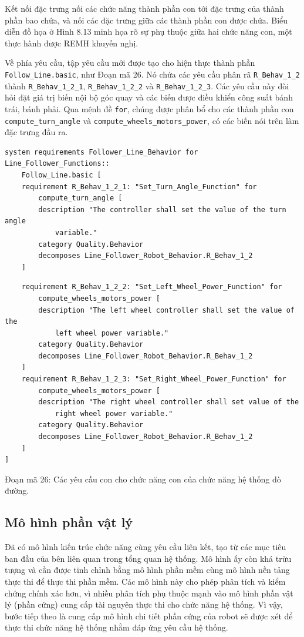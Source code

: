 Kết nối đặc trưng nối các chức năng thành phần con tới đặc trưng của thành phần bao chứa, và nối các đặc trưng giữa các thành phần con được chứa. Biểu diễn đồ họa ở Hình 8.13 minh họa rõ sự phụ thuộc giữa hai chức năng con, một thực hành được REMH khuyến nghị.

Về phía yêu cầu, tập yêu cầu mới được tạo cho hiện thực thành phần \texttt{Follow\_Line.basic}, như Đoạn mã 26. Nó chứa các yêu cầu phân rã \texttt{R\_Behav\_1\_2} thành \texttt{R\_Behav\_1\_2\_1}, \texttt{R\_Behav\_1\_2\_2} và \texttt{R\_Behav\_1\_2\_3}. Các yêu cầu này đòi hỏi đặt giá trị biến nội bộ góc quay và các biến được điều khiển công suất bánh trái, bánh phải. Qua mệnh đề \texttt{for}, chúng được phân bổ cho các thành phần con \texttt{compute\_turn\_angle} và \texttt{compute\_wheels\_motors\_power}, có các biến nói trên làm đặc trưng đầu ra.
\begin{verbatim}
system requirements Follower_Line_Behavior for Line_Follower_Functions::
    Follow_Line.basic [
    requirement R_Behav_1_2_1: "Set_Turn_Angle_Function" for
        compute_turn_angle [
        description "The controller shall set the value of the turn angle
            variable."
        category Quality.Behavior
        decomposes Line_Follower_Robot_Behavior.R_Behav_1_2
    ]
\end{verbatim}
\begin{verbatim}
    requirement R_Behav_1_2_2: "Set_Left_Wheel_Power_Function" for
        compute_wheels_motors_power [
        description "The left wheel controller shall set the value of the
            left wheel power variable."
        category Quality.Behavior
        decomposes Line_Follower_Robot_Behavior.R_Behav_1_2
    ]
    requirement R_Behav_1_2_3: "Set_Right_Wheel_Power_Function" for
        compute_wheels_motors_power [
        description "The right wheel controller shall set value of the
            right wheel power variable."
        category Quality.Behavior
        decomposes Line_Follower_Robot_Behavior.R_Behav_1_2
    ]
]
\end{verbatim}
\begin{center}\small Đoạn mã 26: Các yêu cầu con cho chức năng con của chức năng hệ thống dò đường.\end{center}

\subsection{Mô hình phần vật lý}
Đã có mô hình kiến trúc chức năng cùng yêu cầu liên kết, tạo từ các mục tiêu ban đầu của bên liên quan trong tổng quan hệ thống. Mô hình ấy còn khá trừu tượng và cần được tinh chỉnh bằng mô hình phần mềm cùng mô hình nền tảng thực thi để thực thi phần mềm. Các mô hình này cho phép phân tích và kiểm chứng chính xác hơn, vì nhiều phân tích phụ thuộc mạnh vào mô hình phần vật lý (phần cứng) cung cấp tài nguyên thực thi cho chức năng hệ thống. Vì vậy, bước tiếp theo là cung cấp mô hình chi tiết phần cứng của robot sẽ được xét để thực thi chức năng hệ thống nhằm đáp ứng yêu cầu hệ thống.

